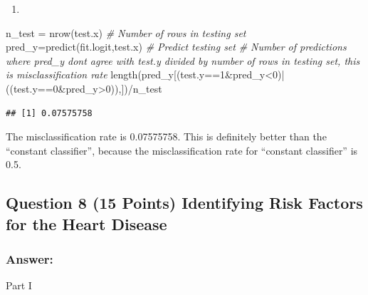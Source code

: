 \documentclass[
]{article}
\newenvironment{Shaded}{\begin{snugshade}}{\end{snugshade}}
\newcommand{\CommentTok}[1]{\textcolor[rgb]{0.56,0.35,0.01}{\textit{#1}}}
\newcommand{\DecValTok}[1]{\textcolor[rgb]{0.00,0.00,0.81}{#1}}
\newcommand{\FunctionTok}[1]{\textcolor[rgb]{0.00,0.00,0.00}{#1}}
\newcommand{\NormalTok}[1]{#1}
\newcommand{\OtherTok}[1]{\textcolor[rgb]{0.56,0.35,0.01}{#1}}
\newcommand{\SpecialCharTok}[1]{\textcolor[rgb]{0.00,0.00,0.00}{#1}}
\providecommand{\tightlist}{%
  \setlength{\itemsep}{0pt}\setlength{\parskip}{0pt}}
\begin{document}
\begin{enumerate}
\def\labelenumi{(\alph{enumi})}
\setcounter{enumi}{4}
\tightlist
\item
\end{enumerate}

\begin{Shaded}
\begin{Highlighting}[]
\NormalTok{n\_test }\OtherTok{=} \FunctionTok{nrow}\NormalTok{(test.x) }\CommentTok{\# Number of rows in testing set}
\NormalTok{pred\_y}\OtherTok{=}\FunctionTok{predict}\NormalTok{(fit.logit,test.x) }\CommentTok{\# Predict testing set}
\CommentTok{\# Number of predictions where pred\_y don\textquotesingle{}t agree with test.y divided by number of rows in testing set, this is misclassification rate}
\FunctionTok{length}\NormalTok{(pred\_y[(test.y}\SpecialCharTok{==}\DecValTok{1}\SpecialCharTok{\&}\NormalTok{pred\_y}\SpecialCharTok{\textless{}}\DecValTok{0}\NormalTok{)}\SpecialCharTok{|}\NormalTok{((test.y}\SpecialCharTok{==}\DecValTok{0}\SpecialCharTok{\&}\NormalTok{pred\_y}\SpecialCharTok{\textgreater{}}\DecValTok{0}\NormalTok{)),])}\SpecialCharTok{/}\NormalTok{n\_test}
\end{Highlighting}
\end{Shaded}

\begin{verbatim}
## [1] 0.07575758
\end{verbatim}

The misclassification rate is 0.07575758. This is definitely better than
the ``constant classifier'', because the misclassification rate for
``constant classifier'' is 0.5.

\hypertarget{question-8-15-points-identifying-risk-factors-for-the-heart-disease}{%
\subsection{Question 8 (15 Points) Identifying Risk Factors for the
Heart
Disease}\label{question-8-15-points-identifying-risk-factors-for-the-heart-disease}}

\hypertarget{answer-4}{%
\subsubsection{Answer:}\label{answer-4}}

Part I
\end{document}
